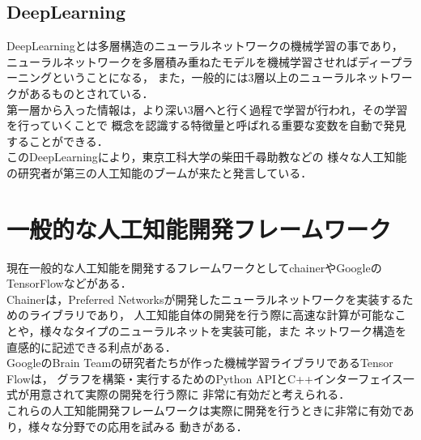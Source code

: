 \subsection{DeepLearning}
DeepLearning\cite{deep}とは多層構造のニューラルネットワークの機械学習の事であり，
ニューラルネットワークを多層積み重ねたモデルを機械学習させればディープラーニングということになる，
また，一般的には3層以上のニューラルネットワークがあるものとされている．
\\

第一層から入った情報は，より深い3層へと行く過程で学習が行われ，その学習を行っていくことで
概念を認識する特徴量と呼ばれる重要な変数を自動で発見することができる．
\\

このDeepLearningにより，東京工科大学の柴田千尋助教\cite{boom}などの
様々な人工知能の研究者が第三の人工知能のブームが来たと発言している．
\\

\section{一般的な人工知能開発フレームワーク}
現在一般的な人工知能を開発するフレームワークとしてchainerやGoogleのTensorFlowなどがある．
\\
Chainerは，Preferred Networksが開発したニューラルネットワークを実装するためのライブラリであり，
人工知能自体の開発を行う際に高速な計算が可能なことや，様々なタイプのニューラルネットを実装可能，また
ネットワーク構造を直感的に記述できる利点がある．
\\
GoogleのBrain Teamの研究者たちが作った機械学習ライブラリであるTensor Flowは，
グラフを構築・実行するためのPython APIとC++インターフェイス一式が用意されて実際の開発を行う際に
非常に有効だと考えられる．
\\

これらの人工知能開発フレームワークは実際に開発を行うときに非常に有効であり，様々な分野での応用を試みる
動きがある．
\\
